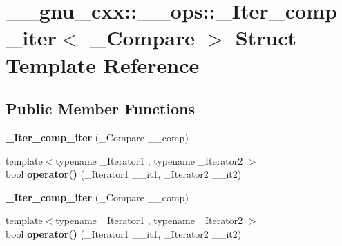 \hypertarget{struct____gnu__cxx_1_1____ops_1_1__Iter__comp__iter}{\section{\+\_\+\+\_\+gnu\+\_\+cxx\+:\+:\+\_\+\+\_\+ops\+:\+:\+\_\+\+Iter\+\_\+comp\+\_\+iter$<$ \+\_\+\+Compare $>$ Struct Template Reference}
\label{struct____gnu__cxx_1_1____ops_1_1__Iter__comp__iter}
}
\subsection*{Public Member Functions}
\begin{DoxyCompactItemize}
\item 
\hypertarget{struct____gnu__cxx_1_1____ops_1_1__Iter__comp__iter_aa1c74bf09707cbcd06df9213078279e1}{{\bfseries \+\_\+\+Iter\+\_\+comp\+\_\+iter} (\+\_\+\+Compare \+\_\+\+\_\+comp)}\label{struct____gnu__cxx_1_1____ops_1_1__Iter__comp__iter_aa1c74bf09707cbcd06df9213078279e1}

\item 
\hypertarget{struct____gnu__cxx_1_1____ops_1_1__Iter__comp__iter_acccc0727f5e7c0d3a801dbee44a90201}{{\footnotesize template$<$typename \+\_\+\+Iterator1 , typename \+\_\+\+Iterator2 $>$ }\\bool {\bfseries operator()} (\+\_\+\+Iterator1 \+\_\+\+\_\+it1, \+\_\+\+Iterator2 \+\_\+\+\_\+it2)}\label{struct____gnu__cxx_1_1____ops_1_1__Iter__comp__iter_acccc0727f5e7c0d3a801dbee44a90201}

\item 
\hypertarget{struct____gnu__cxx_1_1____ops_1_1__Iter__comp__iter_aa1c74bf09707cbcd06df9213078279e1}{{\bfseries \+\_\+\+Iter\+\_\+comp\+\_\+iter} (\+\_\+\+Compare \+\_\+\+\_\+comp)}\label{struct____gnu__cxx_1_1____ops_1_1__Iter__comp__iter_aa1c74bf09707cbcd06df9213078279e1}

\item 
\hypertarget{struct____gnu__cxx_1_1____ops_1_1__Iter__comp__iter_acccc0727f5e7c0d3a801dbee44a90201}{{\footnotesize template$<$typename \+\_\+\+Iterator1 , typename \+\_\+\+Iterator2 $>$ }\\bool {\bfseries operator()} (\+\_\+\+Iterator1 \+\_\+\+\_\+it1, \+\_\+\+Iterator2 \+\_\+\+\_\+it2)}\label{struct____gnu__cxx_1_1____ops_1_1__Iter__comp__iter_acccc0727f5e7c0d3a801dbee44a90201}

\end{DoxyCompactItemize}
